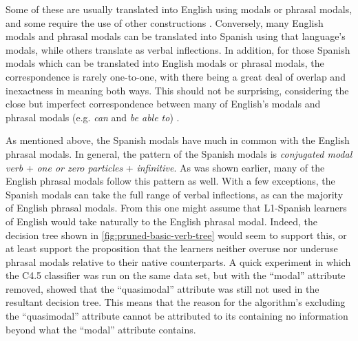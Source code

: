 \documentclass[main.tex]{subfiles}
\begin{document}
Some of these are usually translated into English using modals or phrasal modals, and some require the use of other constructions \citep[pp. 325-32]{butt}. Conversely, many English modals and phrasal modals can be translated into Spanish using that language's modals, while others translate as verbal inflections. In addition, for those Spanish modals which can be translated into English modals or phrasal modals, the correspondence is rarely one-to-one, with there being a great deal of overlap and inexactness in meaning both ways. This should not be surprising, considering the close but imperfect correspondence between many of English's modals and phrasal modals (e.g. \textit{can} and \textit{be able to}) \citep[pp. 137-157]{celce-murcia:1999}.

As mentioned above, the Spanish modals have much in common with the English phrasal modals. In general, the pattern of the Spanish modals is \textit{conjugated modal verb} + \textit{one or zero particles} + \textit{infinitive}. As was shown earlier, many of the English phrasal modals follow this pattern as well. With a few exceptions, the Spanish modals can take the full range of verbal inflections, as can the majority of English phrasal modals. From this one might assume that L1-Spanish learners of English would take naturally to the English phrasal modal. Indeed, the decision tree shown in \ref{fig:pruned-basic-verb-tree} would seem to support this, or at least support the proposition that the learners neither overuse nor underuse phrasal modals relative to their native counterparts. A quick experiment in which the C4.5 classifier was run on the same data set, but with the ``modal'' attribute removed, showed that the ``quasimodal'' attribute was still not used in the resultant decision tree. This means that the reason for the algorithm's excluding the ``quasimodal'' attribute cannot be attributed to its containing no information beyond what the ``modal'' attribute contains.
\end{document}
